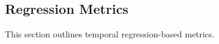 \subsection{Regression Metrics}
\label{sec:regressionmetrics}

This section outlines temporal regression-based metrics.